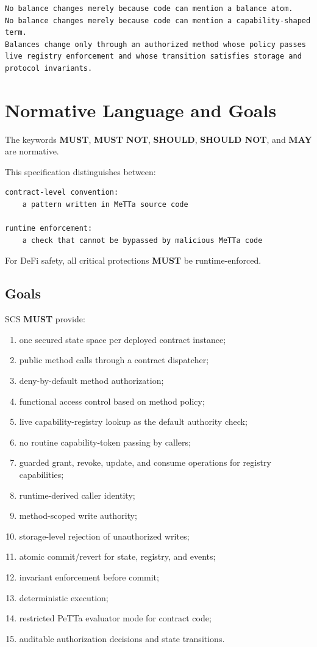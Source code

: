 \documentclass[11pt]{article}
\newcommand{\SCS}{\textsc{SCS}}
\newcommand{\PeTTa}{PeTTa}
\newcommand{\MUST}{\textbf{MUST}}
\newcommand{\MUSTNOT}{\textbf{MUST NOT}}
\newcommand{\SHOULD}{\textbf{SHOULD}}
\newcommand{\SHOULDNOT}{\textbf{SHOULD NOT}}
\newcommand{\MAY}{\textbf{MAY}}
\begin{document}
\begin{lstlisting}
No balance changes merely because code can mention a balance atom.
No balance changes merely because code can mention a capability-shaped term.
Balances change only through an authorized method whose policy passes live registry enforcement and whose transition satisfies storage and protocol invariants.
\end{lstlisting}



\section{Normative Language and Goals}

The keywords \MUST{}, \MUSTNOT{}, \SHOULD{}, \SHOULDNOT{}, and \MAY{} are normative.

This specification distinguishes between:

\begin{lstlisting}
contract-level convention:
    a pattern written in MeTTa source code

runtime enforcement:
    a check that cannot be bypassed by malicious MeTTa code
\end{lstlisting}

For DeFi safety, all critical protections \MUST{} be runtime-enforced.

\subsection{Goals}

\SCS{} \MUST{} provide:

\begin{enumerate}
  \item one secured state space per deployed contract instance;
  \item public method calls through a contract dispatcher;
  \item deny-by-default method authorization;
  \item functional access control based on method policy;
  \item live capability-registry lookup as the default authority check;
  \item no routine capability-token passing by callers;
  \item guarded grant, revoke, update, and consume operations for registry capabilities;
  \item runtime-derived caller identity;
  \item method-scoped write authority;
  \item storage-level rejection of unauthorized writes;
  \item atomic commit/revert for state, registry, and events;
  \item invariant enforcement before commit;
  \item deterministic execution;
  \item restricted \PeTTa{} evaluator mode for contract code;
  \item auditable authorization decisions and state transitions.
\end{enumerate}
\end{document}

